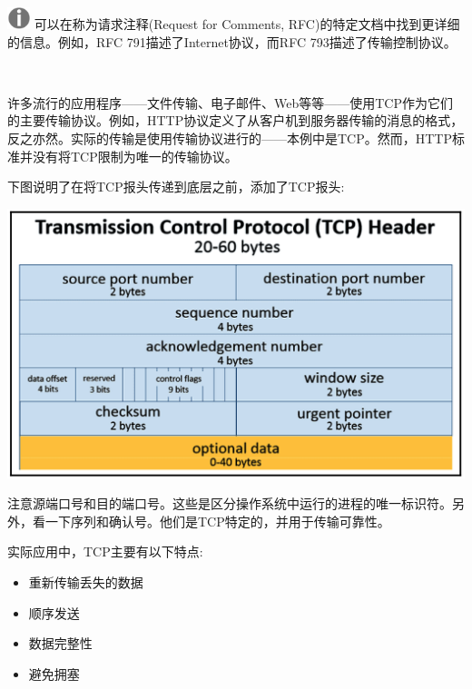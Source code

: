 \hspace*{\fill} \\ %
\includegraphics[width=0.05\textwidth]{images/warn}
可以在称为请求注释(Request for Comments, RFC)的特定文档中找到更详细的信息。例如，RFC 791描述了Internet协议，而RFC 793描述了传输控制协议。 \par
\noindent\textbf{}\ \par

许多流行的应用程序——文件传输、电子邮件、Web等等——使用TCP作为它们的主要传输协议。例如，HTTP协议定义了从客户机到服务器传输的消息的格式，反之亦然。实际的传输是使用传输协议进行的——本例中是TCP。然而，HTTP标准并没有将TCP限制为唯一的传输协议。 \par
下图说明了在将TCP报头传递到底层之前，添加了TCP报头: \par

\begin{center}
	\includegraphics[width=1.0\textwidth]{content/Section-2/Chapter-12/7}
\end{center}

注意源端口号和目的端口号。这些是区分操作系统中运行的进程的唯一标识符。另外，看一下序列和确认号。他们是TCP特定的，并用于传输可靠性。 \par
实际应用中，TCP主要有以下特点: \par

\begin{itemize}
	\item 重新传输丢失的数据
	\item 顺序发送
	\item 数据完整性
	\item 避免拥塞
\end{itemize}

